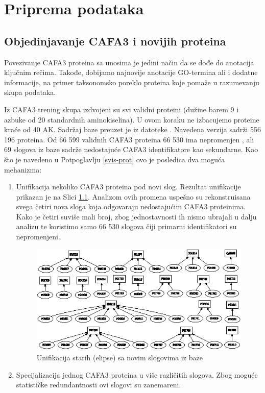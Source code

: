 
\chapter{Priprema podataka} %

\label{Priprema_podataka} %

\section{Objedinjavanje CAFA3 i novijih \swissprot proteina}
\label{objedinjavanje}

Povezivanje CAFA3 proteina sa \swissprot unosima je jedini način da se dođe do
anotacija ključnim rečima. Takođe, dobijamo najnovije anotacije GO-termina ali
i dodatne informacije, na primer taksonomsko poreklo proteina koje pomaže
u razumevanju skupa podataka.

Iz CAFA3 trening skupa izdvojeni su svi validni proteini (dužine barem 9 i
azbuke od 20 standardnih aminokiselina). U ovom koraku ne izbacujemo proteine
kraće od 40 AK.  Sadržaj baze \swissprot preuzet je iz datoteke  \cite{sprot}.
Navedena verzija sadrži 556 196 proteina.  Od 66 599 validnih CAFA3 proteina 66
530 ima nepromenjen , ali 69 slogova iz
baze \swissprot sadrže nedostajuće CAFA3 identifikatore kao sekundarne. Kao što
je navedeno u Potpoglavlju \ref{svis-prot} ovo je posledica dva moguća
mehanizma:

\begin{enumerate}
  \item Unifikacija nekoliko CAFA3 proteina pod novi slog.
    Rezultat unifikacije prikazan je na Slici \ref{fig:unifikacija_slogova}. Analizom
    ovih promena uspešno su rekonstruisana svega četiri nova \swissprot sloga
    koja odgovaraju nedostajućim CAFA3 proteinima. Kako je četiri
    suviše mali broj, zbog jednostavnosti ih nismo ubrajali u dalju analizu
    te koristimo samo 66 530 slogova čiji primarni identifikatori su nepromenjeni.

  \begin{figure}[th]
  \centering
  \includegraphics[scale=2]{plots/unifikacija_slogova2.eps}
  \caption{Unifikacija starih (elipse) sa novim slogovima iz baze \swissprot}
  \label{fig:unifikacija_slogova}
  \end{figure}

  \item Specijalizacija jednog CAFA3 proteina u više različitih slogova.  Zbog moguće
    statističke redundantnosti ovi slogovi su zanemareni.
\end{enumerate}


